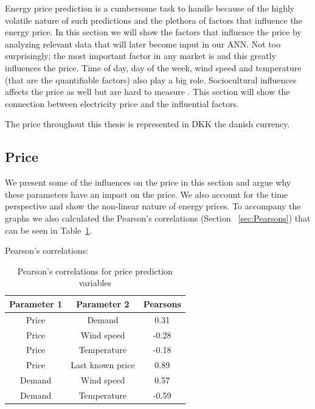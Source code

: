 Energy price prediction is a cumbersome task to handle because of the highly volatile nature of such predictions \cite{pjmForecast, yamin2004adaptive} and the plethora of factors that influence the energy price\cite{singhal2011electricity}. In this section we will show the factors that influence the price by analyzing relevant data that will later become input in our ANN. Not too surprisingly; the most important factor in any market is  and this greatly influences the price. Time of day, day of the week, wind speed and temperature (that are the quantifiable factors) also play a big role. Sociocultural influences affects the price as well but are hard to measure \cite{singhal2011electricity}. This section will show the connection between electricity price and the influential factors.

\noindent The price throughout this thesis is represented in DKK the danish currency.

\subsection{Price}\label{sec:Price}
We present some of the influences on the price in this section and argue why these parameters have an impact on the price. We also account for the time perspective and show the non-linear nature of energy prices. To accompany the graphs we also calculated the Pearson's correlations (Section ~\ref{sec:Pearsons}) that can be seen in Table~\ref{table:pearsonsPriceVariables}.

Pearson's correlations:
\begin{table}[H]
\centering  %
\begin{tabular}{|c|c|c|} %
 \hline
 Parameter 1 & Parameter 2 & Pearsons \\ [0.5ex] %
\hline                  %
Price & Demand & 0.31 \\ \hline
Price & Wind speed & -0.28  \\ \hline
Price & Temperature & -0.18 \\ \hline
Price & Last known price & 0.89 \\ \hline
Demand & Wind speed & 0.57 \\ \hline
Demand & Temperature & -0.59 \\ \hline
\end{tabular}
\caption{Pearson's correlations for price prediction variables} %
\label{table:pearsonsPriceVariables} %
\end{table}

